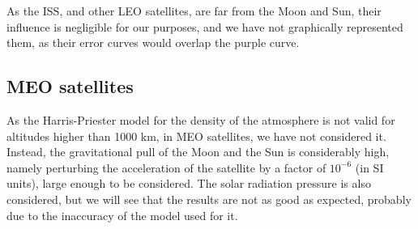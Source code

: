 \documentclass[../main.tex]{subfiles}
\begin{document}
As the ISS, and other LEO satellites, are far from the Moon and Sun, their influence is negligible for our purposes, and we have not graphically represented them, as their error curves would overlap the purple curve.

\subsection{MEO satellites}
As the Harris-Priester model for the density of the atmosphere is not valid for altitudes higher than 1000 km, in MEO satellites, we have not considered it. Instead, the gravitational pull of the Moon and the Sun is considerably high, namely perturbing the acceleration of the satellite by a factor of $10^{-6}$ (in SI units), large enough to be considered. The solar radiation pressure is also considered, but we will see that the results are not as good as expected, probably due to the inaccuracy of the model used for it.
\end{document}
